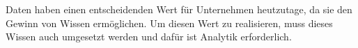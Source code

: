 \documentclass[../main.tex]{subfiles}
\begin{document}
Daten haben einen entscheidenden Wert für Unternehmen heutzutage, da sie den Gewinn von Wissen ermöglichen.
Um diesen Wert zu realisieren, muss dieses Wissen auch umgesetzt werden und dafür ist Analytik erforderlich.
~\cite{monino2021data}
\end{document}
